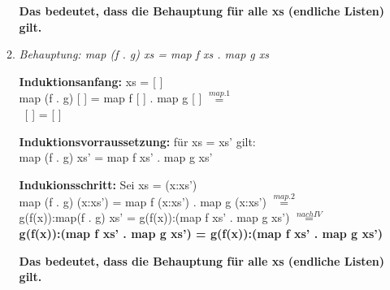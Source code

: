 \documentclass[11pt]{article}
\begin{document}
\begin{enumerate}
\begin{enumerate}
\vspace*{0.5cm}
\textbf{Das bedeutet, dass die Behauptung für alle xs (endliche Listen) gilt.}

\vspace*{0.5cm}
\item
\textit{Behauptung: map (f . g) xs = map f xs . map g xs}

\vspace*{0.5cm}
\textbf{Induktionsanfang:} xs = [ ]\\
map (f . g) [ ] = map f [ ] . map g [ ] $\stackrel{map.1}{=}$\\
\ [ ] = [ ]


\vspace*{0.5cm}
\textbf{Induktionsvorraussetzung:} für xs = xs' gilt:\\
map (f . g) xs' = map f xs' . map g xs'

\vspace*{0.5cm}
\textbf{Indukionsschritt:} Sei xs = (x:xs')\\
map (f . g) (x:xs') = map f (x:xs') . map g (x:xs') $\stackrel{map.2}{=}$\\
g(f(x)):map(f . g) xs' = g(f(x)):(map f xs' . map g xs') $\stackrel{nach IV}{=}$\\
\textbf{g(f(x)):(map f xs' . map g xs') = g(f(x)):(map f xs' . map g xs')}

\vspace*{0.5cm}
\textbf{Das bedeutet, dass die Behauptung für alle xs (endliche Listen) gilt.}
\end{enumerate}
\end{enumerate}
\end{document}
